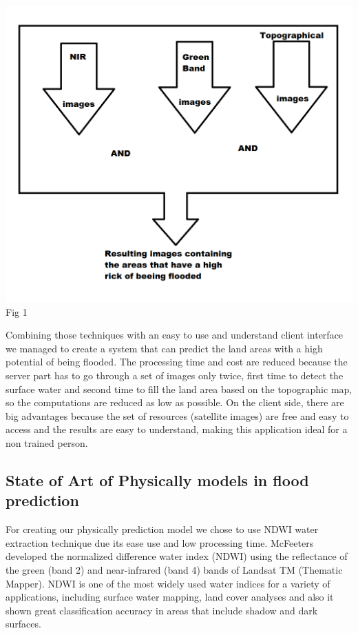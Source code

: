 \documentclass[12pt, a4paper]{report}
\begin{document}
\begin{center}
	\includegraphics[scale=0.6]{application_outline.png} 
	Fig 1
\end{center}

Combining those techniques with an easy to use and understand client interface we managed to create a system that can predict the land areas with a high potential of being flooded. The processing time and cost are reduced because the server part has to go through a set of images only twice, first time to detect the surface water and second time to fill the land area based on the topographic map, so the computations are reduced as low as possible. On the client side, there are big advantages because the set of resources (satellite images) are free and easy to access and the results are easy to understand, making this application ideal for a non trained person.
\par





\subsection{State of Art of Physically models in flood prediction}

\quad
For creating our physically prediction model we chose to use NDWI water extraction technique due its ease use and low processing time. McFeeters \cite{McFeeters} developed the normalized difference water index (NDWI) using the reflectance of the green (band 2) and near-infrared (band 4) bands of Landsat TM (Thematic Mapper). NDWI is one of the most widely used water indices for a variety of applications, including surface water mapping, land cover analyses \cite{Duan, Poulin, Hui} and also it shown great classification accuracy in areas that include shadow and dark surfaces.
\par 
\end{document}
